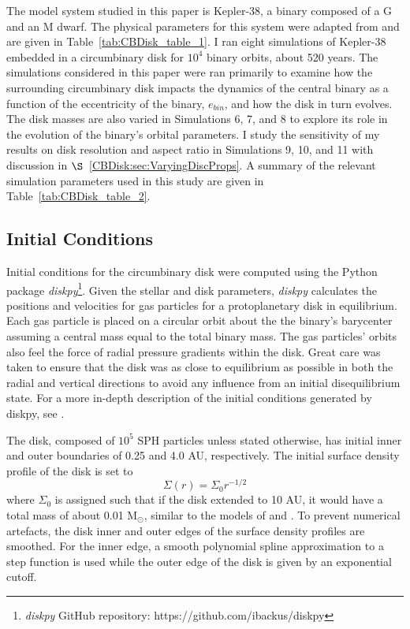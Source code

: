 The model system studied in this paper is Kepler-38, a binary composed of a G and an M dwarf.  The physical parameters for this 
system were adapted from \citet{Orosz2012} and are given in Table~\ref{tab:CBDisk_table_1}.  I ran eight simulations of Kepler-38 embedded in a 
circumbinary disk for $10^4$ binary orbits, about 520 years.  The simulations considered in this paper were ran primarily to examine how 
the surrounding circumbinary disk impacts the dynamics of the central
binary as a function of the eccentricity of the binary, $e_{bin}$, and
how the disk in turn evolves.  The disk masses are also varied in Simulations 6, 7, and 8 to explore its role in the evolution of the binary's orbital parameters.  
I study the sensitivity of my results on disk resolution and aspect ratio in Simulations 9, 10, and 11 with discussion in $\S$~\ref{CBDisk:sec:VaryingDiscProps}.  A summary of the relevant simulation parameters used in this study are given in Table~\ref{tab:CBDisk_table_2}. 

\subsection{Initial Conditions}

Initial conditions for the circumbinary disk were computed using the
Python package {\em diskpy}\footnote{{\em diskpy} GitHub repository: https://github.com/ibackus/diskpy}.  
Given the stellar and disk parameters, {\em diskpy}
calculates the positions and velocities for gas particles for a
protoplanetary disk in equilibrium.   Each gas particle is placed on a
circular orbit about the the binary's barycenter assuming a central
mass equal to the total binary mass.  
The gas particles' orbits also feel the force of radial pressure gradients within the disk.  Great care was taken to ensure that the disk
was as close to equilibrium as possible in both the radial and vertical directions to avoid any influence from an initial disequilibrium
state.  For a more in-depth description of the initial conditions generated by diskpy, see \citet{Backus2016}.

The disk, composed of $10^5$ SPH particles unless stated otherwise, has initial inner and outer boundaries of 0.25 and 4.0 AU,
respectively.  The initial surface density profile of the disk is set to 
\begin{equation}
\Sigma(r) = \Sigma_0 r^{-1/2}
\end{equation}
 where $\Sigma_0$ is assigned such that if the disk extended to 10 AU, it would have a total mass of about 0.01 
M$_{\odot}$, similar to the models of \citet{Pierens2007} and \citet{Kley2014}.  To prevent numerical 
artefacts, the disk inner and outer edges of the surface density profiles are smoothed.  For the inner edge, a smooth polynomial spline approximation to a step function is used while the outer edge of the disk is given by an exponential cutoff.
 
